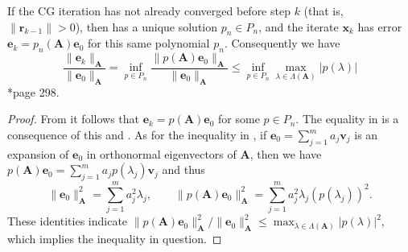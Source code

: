\begin{thm} \label{theorem: CG-convg}
    If the CG iteration has not already converged before step $k$ (that is, $\| \bm{r}_{k-1} \| > 0 $), then  has a unique solution $p_n \in P_n$, and the iterate $\bm{x}_{k}$ has error $\bm{e}_k = p_n \left( \bm{A} \right) \bm{e}_{0}$ for this same polynomial $p_n$. Consequently we have
    \begin{equation} \label{eq: CG-err-bounds}
        \frac{\| \bm{e}_k \|_{\bm{A}}}{\| \bm{e}_{0} \|_{\bm{A}}} = \inf_{p \in P_n} \frac{\| p \left( \bm{A} \right) \bm{e}_{0} \|_{\bm{A}}}{\| \bm{e}_{0} \|_{\bm{A}}} \leq \inf_{p \in P_n} \max_{\lambda \in \Lambda \left( \bm{A} \right)} \left| p (\lambda) \right|
    \end{equation}
    \cite{TrefethenLloydN.LloydNicholas1997Nla/}*{page 298}.
\end{thm}

\begin{proof}
    From  it follows that $\bm{e}_{k} = p \left( \bm{A} \right) \bm{e}_{0}$ for some $p \in P_n$. The equality in  is a consequence of this and . As for the inequality in , if $\bm{e}_{0} = \sum_{j=1}^{m} a_j \bm{v}_j$ is an expansion of $\bm{e}_{0}$ in orthonormal eigenvectors of $\bm{A}$, then we have $p \left( \bm{A} \right) \bm{e}_{0} = \sum_{j=1}^{m} a_j p \left( \lambda_j \right) \bm{v}_{j}$ and thus
    \[
        \| \bm{e}_{0} \|_{\bm{A}}^{2} = \sum_{j=1}^{m} a_{j}^{2} \lambda_j, \qquad \| p \left( \bm{A} \right) \bm{e}_0 \|_{\bm{A}}^{2} = \sum_{j=1}^{m} a_{j}^{2} \lambda_j \left( p \left( \lambda_j \right) \right)^{2}.
    \]
    These identities indicate $\| p \left( \bm{A} \right) \bm{e}_{0} \|_{\bm{A}}^{2} / \| \bm{e}_{0} \|_{\bm{A}}^{2} \leq \max_{\lambda \in \Lambda \left( \bm{A} \right)} \left| p (\lambda) \right|^{2}$, which implies the inequality in question.
\end{proof}